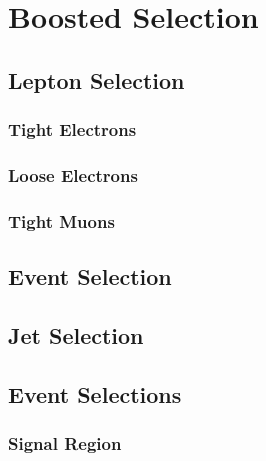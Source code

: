 \section{Boosted Selection}

\subsection{Lepton Selection}

\subsubsection{Tight Electrons}

\subsubsection{Loose Electrons}

\subsubsection{Tight Muons}

\subsection{Event Selection}

\subsection{Jet Selection}

\subsection{Event Selections}

\subsubsection{Signal Region}


